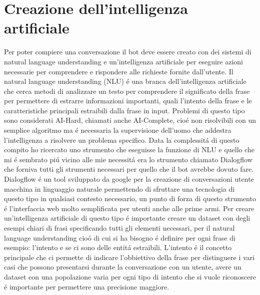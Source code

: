 \section{Creazione dell'intelligenza artificiale}

Per poter compiere una conversazione il bot deve essere creato con dei sistemi di natural language understanding e un'intelligenza artificiale per eseguire azioni necessarie per comprendere e rispondere alle richieste fornite dall'utente.
Il natural language understanding (NLU) \'e una branca dell'intelligenza artificiale che cerca metodi di analizzare un testo per comprendere il significato della frase per permettere di estrarre informazioni importanti, quali l'intento della frase e le caratteristiche principali estraibili dalla frase in input. Problemi di questo tipo sono considerati AI-Hard, chiamati anche AI-Complete, cio\'e non risolvibili con un semplice algoritmo ma \'e necessaria la supervisione dell'uomo che addestra l'intelligenza a risolvere un problema specifico.
Data la complessit\'a di questo compito ho ricercato uno strumento che eseguisse la funzione di NLU e quello che mi \'e sembrato pi\'u vicino alle mie necessit\'a era lo strumento chiamato Dialogflow che forniva tutti gli strumenti necessari per quello che il bot avrebbe dovuto fare.
Dialogflow \'e un tool sviluppato da google per la creazione di conversazioni utente macchina in linguaggio naturale permettendo di sfruttare una tecnologia di questo tipo in qualsiasi contesto necessario, un punto di forza di questo strumento \'e l'interfaccia web molto semplificata per utenti anche alle prime armi.
Per creare un'intelligenza artificiale di questo tipo \'e importante creare un dataset con degli esempi chiari di frasi specificando tutti gli elementi necessari, per il natural language understanding cio\'o di cui si ha bisogno \'e definire per ogni frase di esempio: l'intento e se ci sono delle entit\'a estraibili. 
L'intento \'e il concetto principale che ci permette di indicare l'obbiettivo della frase per distinguere i vari casi che possono presentarsi durante la conversazione con un utente, avere un dataset con una popolazione varia per ogni tipo di intento che si vuole riconoscere \'e importante per permettere una precisione maggiore. 
